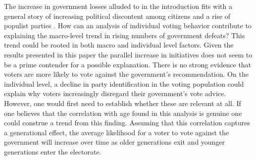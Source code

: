 \documentclass[11pt,a4paper]{article}\usepackage[]{graphicx}\usepackage[]{color}
\begin{document}
   The increase in government losses alluded to in the introduction fits with a general story of increasing political discontent among citizens and a rise of populist parties  \citep[e.g.][]{mair_ruling_2013}. How can an analysis of individual voting behavior contribute to explaining the macro-level trend in rising numbers of government defeats? 
   This trend could be rooted in both macro and individual level factors. Given the results presented in this paper the parallel increase in initiatives does not seem to be a prime contender for a possible explanation. There is no strong evidence that voters are more likely to vote against the government's recommendation. On the individual level, a decline in party identification in the voting population could explain why voters increasingly disregard their government's vote advice. However, one would first need to establish whether these are relevant at all. If one believes that the correlation with age found in this analysis is genuine one could construe a trend from this finding. Assuming that this correlation captures a generational effect, the average likelihood for a voter to vote against the government will increase over time as older generations exit and younger generations enter the electorate. 
    
    
    \small\printbibliography
\end{document}
